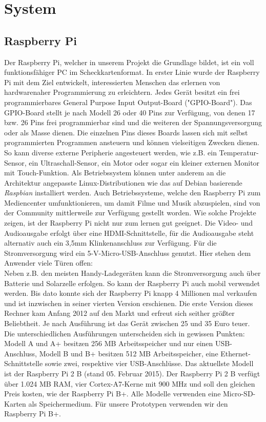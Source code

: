 \documentclass[journal]{IEEEtran}
\begin{document}
\section{System}
\subsection{Raspberry Pi}
Der Raspberry Pi, welcher in unserem Projekt die Grundlage bildet, ist ein voll funktionsfähiger PC im Scheckkartenformat. In erster Linie wurde der Raspberry Pi mit dem Ziel entwickelt, interessierten Menschen das erlernen von hardwarenaher Programmierung zu erleichtern. Jedes Gerät besitzt ein frei programmierbares General Purpose Input Output-Board ("GPIO-Board"). Das GPIO-Board stellt je nach Modell 26 oder 40 Pins zur Verfügung, von denen 17 bzw. 26 Pins frei programmierbar sind und die weiteren der Spannungsversorgung oder als Masse dienen. Die einzelnen Pins dieses Boards lassen sich mit selbst programmierten Programmen ansteuern und können vielseitigen Zwecken dienen. So kann diverse externe Peripherie angesteuert werden, wie z.B. ein Temperatur-Sensor, ein Ultraschall-Sensor, ein Motor oder sogar ein kleiner externen Monitor mit Touch-Funktion. Als Betriebssystem können unter anderem an die Architektur angepasste Linux-Distributionen wie das auf Debian basierende \textit{Raspbian} installiert werden.  Auch Betriebssysteme, welche den Raspberry Pi zum Mediencenter umfunktionieren, um damit Filme und Musik abzuspielen, sind von der Community mittlerweile zur Verfügung gestellt worden. Wie solche Projekte zeigen, ist der Raspberry Pi nicht nur zum lernen gut geeignet. Die Video- und Audioausgabe erfolgt über eine HDMI-Schnittstelle, für die Audioausgabe steht alternativ auch ein 3,5mm Klinkenanschluss zur Verfügung. Für die Stromversorgung wird ein 5-V-Micro-USB-Anschluss genutzt. Hier stehen dem Anwender viele Türen offen: \\ Neben z.B. den meisten Handy-Ladegeräten kann die Stromversorgung auch über Batterie und Solarzelle erfolgen. So kann der Raspberry Pi auch mobil verwendet werden. Bis dato konnte sich der Raspberry Pi knapp 4 Millionen mal verkaufen und ist inzwischen in seiner vierten Version erschienen. \cite{verkaufszahlen} Die erste Version dieses Rechner kam Anfang 2012 auf den Markt und erfreut sich seither größter Beliebtheit. Je nach Ausführung ist das Gerät zwischen 25 und 35 Euro teuer. Die unterschiedlichen Ausführungen unterscheiden sich in gewissen Punkten: \\ Modell A und A+ besitzen 256 MB Arbeitsspeicher und nur einen USB-Anschluss, Modell B und B+ besitzen 512 MB Arbeitsspeicher, eine Ethernet-Schnittstelle sowie zwei, respektive vier USB-Anschlüsse. Das aktuellste Modell ist der Raspberry Pi 2 B (stand 05. Februar 2015). Der Raspberry Pi 2 B verfügt über 1.024 MB RAM, vier Cortex-A7-Kerne mit 900 MHz und soll den gleichen Preis kosten, wie der Raspberry Pi B+. Alle Modelle verwenden eine Micro-SD-Karten als Speichermedium. Für unsere Prototypen verwenden wir den Raspberry Pi B+.
\end{document}
